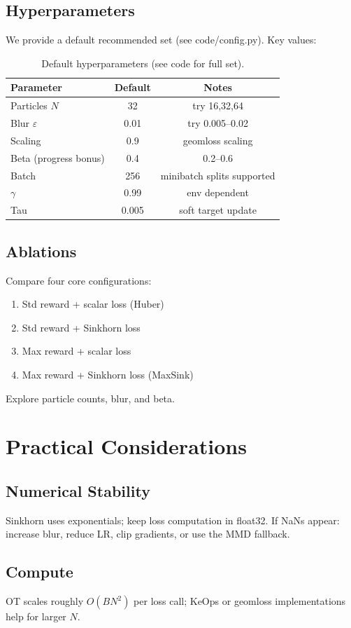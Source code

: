 \documentclass[10pt,twocolumn]{article}
\begin{document}
\subsection{Hyperparameters}
We provide a default recommended set (see code/config.py). Key values:
\begin{table}[h!]
\centering
\begin{tabular}{lcc}
\toprule
Parameter & Default & Notes \\
\midrule
Particles $N$ & 32 & try 16,32,64\\
Blur $\varepsilon$ & 0.01 & try 0.005–0.02 \\
Scaling & 0.9 & geomloss scaling \\
Beta (progress bonus) & 0.4 & 0.2–0.6 \\
Batch & 256 & minibatch splits supported \\
$\gamma$ & 0.99 & env dependent \\
Tau & 0.005 & soft target update \\
\bottomrule
\end{tabular}
\caption{Default hyperparameters (see code for full set).}
\end{table}

\subsection{Ablations}
Compare four core configurations:
\begin{enumerate}
  \item Std reward + scalar loss (Huber)
  \item Std reward + Sinkhorn loss
  \item Max reward + scalar loss
  \item Max reward + Sinkhorn loss (MaxSink)
\end{enumerate}
Explore particle counts, blur, and beta.

\section{Practical Considerations}
\subsection{Numerical Stability}
Sinkhorn uses exponentials; keep loss computation in float32. If NaNs appear: increase blur, reduce LR, clip gradients, or use the MMD fallback.
\subsection{Compute}
OT scales roughly $O(BN^2)$ per loss call; KeOps or geomloss implementations help for larger $N$.
\end{document}
